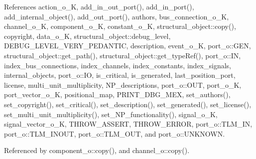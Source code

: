 References action\+\_\+o\+\_\+K, add\+\_\+in\+\_\+out\+\_\+port(), add\+\_\+in\+\_\+port(), add\+\_\+internal\+\_\+object(), add\+\_\+out\+\_\+port(), authors, bus\+\_\+connection\+\_\+o\+\_\+K, channel\+\_\+o\+\_\+K, component\+\_\+o\+\_\+K, constant\+\_\+o\+\_\+K, structural\+\_\+object\+::copy(), copyright, data\+\_\+o\+\_\+K, structural\+\_\+object\+::debug\+\_\+level, D\+E\+B\+U\+G\+\_\+\+L\+E\+V\+E\+L\+\_\+\+V\+E\+R\+Y\+\_\+\+P\+E\+D\+A\+N\+T\+IC, description, event\+\_\+o\+\_\+K, port\+\_\+o\+::\+G\+EN, structural\+\_\+object\+::get\+\_\+path(), structural\+\_\+object\+::get\+\_\+type\+Ref(), port\+\_\+o\+::\+IN, index\+\_\+bus\+\_\+connections, index\+\_\+channels, index\+\_\+constants, index\+\_\+signals, internal\+\_\+objects, port\+\_\+o\+::\+IO, is\+\_\+critical, is\+\_\+generated, last\+\_\+position\+\_\+port, license, multi\+\_\+unit\+\_\+multiplicity, N\+P\+\_\+descriptions, port\+\_\+o\+::\+O\+UT, port\+\_\+o\+\_\+K, port\+\_\+vector\+\_\+o\+\_\+K, positional\+\_\+map, P\+R\+I\+N\+T\+\_\+\+D\+B\+G\+\_\+\+M\+EX, set\+\_\+authors(), set\+\_\+copyright(), set\+\_\+critical(), set\+\_\+description(), set\+\_\+generated(), set\+\_\+license(), set\+\_\+multi\+\_\+unit\+\_\+multiplicity(), set\+\_\+\+N\+P\+\_\+functionality(), signal\+\_\+o\+\_\+K, signal\+\_\+vector\+\_\+o\+\_\+K, T\+H\+R\+O\+W\+\_\+\+A\+S\+S\+E\+RT, T\+H\+R\+O\+W\+\_\+\+E\+R\+R\+OR, port\+\_\+o\+::\+T\+L\+M\+\_\+\+IN, port\+\_\+o\+::\+T\+L\+M\+\_\+\+I\+N\+O\+UT, port\+\_\+o\+::\+T\+L\+M\+\_\+\+O\+UT, and port\+\_\+o\+::\+U\+N\+K\+N\+O\+WN.



Referenced by component\+\_\+o\+::copy(), and channel\+\_\+o\+::copy().


